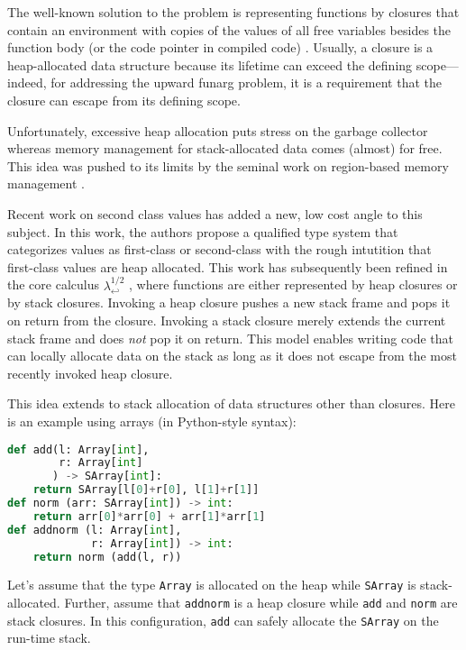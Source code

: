 \documentclass[sigplan,review,dvipsnames,screen,10pt]{acmart}
\newcommand{\LamWhatif}{\ensuremath{\lambda^{1/2}_{\hookleftarrow}}}
\begin{document}
The well-known solution to the problem is representing functions by
closures that contain an environment with copies of the values of all
free variables besides the function body (or the code pointer in
compiled code) \cite{landin66,DBLP:conf/acm/Reynolds72}.
Usually, a closure is a heap-allocated data structure because its
lifetime can exceed the defining scope---indeed, for addressing the
upward funarg problem, it is a requirement that the closure can escape
from its defining scope.

Unfortunately, excessive heap allocation puts stress on the garbage
collector whereas memory management for stack-allocated data comes
(almost) for free. This idea was pushed to its limits by the seminal work on
region-based memory management
\cite{DBLP:conf/popl/TofteT94,DBLP:journals/iandc/TofteT97}.

Recent work on second class values
\cite{DBLP:conf/oopsla/OsvaldEWAR16} has
added a new, low cost angle to this subject. In this work, the authors
propose a qualified type system that categorizes values as first-class
or second-class with the rough intutition that first-class values are
heap allocated. This work has subsequently been refined in the core
calculus $\LamWhatif$
\cite{DBLP:conf/ecoop/XhebrajB0R22}, where functions are
either represented by heap closures or by stack closures. Invoking a
heap closure pushes a new stack frame and pops it on return from the
closure. Invoking a stack closure merely extends the current stack
frame and does \emph{not} pop it on return.
This model enables writing code that can locally allocate data on the
stack as long as it does not escape from the most recently invoked
heap closure.

This idea extends to stack allocation of data structures
other than closures. Here is an example using arrays (in Python-style syntax):
\begin{lstlisting}[language=python]
def add(l: Array[int],
        r: Array[int]
       ) -> SArray[int]:
    return SArray[l[0]+r[0], l[1]+r[1]]
def norm (arr: SArray[int]) -> int:
    return arr[0]*arr[0] + arr[1]*arr[1]
def addnorm (l: Array[int],
             r: Array[int]) -> int:
    return norm (add(l, r))
\end{lstlisting}
Let's assume that the type \texttt{Array} is
allocated on the heap while \texttt{SArray} is stack-allocated.
Further,  assume that \texttt{addnorm} is a heap closure while \texttt{add}
and \texttt{norm} are stack closures.
In this configuration, \texttt{add} can safely allocate the
\texttt{SArray} on the run-time stack.
\end{document}

